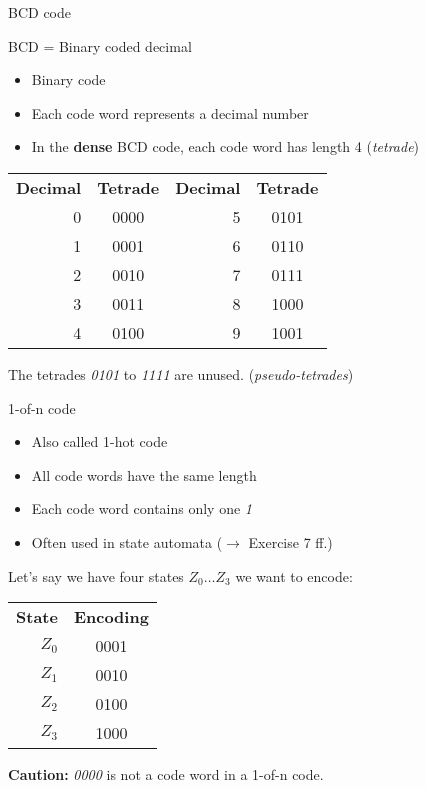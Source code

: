 \documentclass[11pt]{tudbeamer}
\begin{document}
\begin{frame}{BCD code}
	\centering
	
	BCD = Binary coded decimal
	\begin{itemize}
		\item Binary code
		\item Each code word represents a decimal number
		\item In the \textbf{dense} BCD code, each code word has length 4 (\textit{tetrade})
	\end{itemize}
	
	\begin{tabular}{rc|rc}
		\textbf{Decimal}	& \textbf{Tetrade} & \textbf{Decimal} & \textbf{Tetrade} \\
		0 & 0000 & 5 & 0101 \\
		1 & 0001 & 6 & 0110 \\
		2 & 0010 & 7 & 0111 \\
		3 & 0011 & 8 & 1000 \\
		4 & 0100 & 9 & 1001 \\
	\end{tabular}
	
	The tetrades \textit{0101} to \textit{1111} are unused. (\textit{pseudo-tetrades})

\end{frame}

\begin{frame}{1-of-n code}
\centering

	\begin{itemize}
		\item Also called 1-hot code
		\item All code words have the same length
		\item Each code word contains only one \textit{1}
		\item Often used in state automata ($\rightarrow$ Exercise 7 ff.)
	\end{itemize}
	
	Let's say we have four states $Z_0 \dots Z_3$ we want to encode:
	
	\begin{tabular}{rc}
		\textbf{State} & \textbf{Encoding} \\
		$Z_0$ & 0001 \\
		$Z_1$ & 0010 \\
		$Z_2$ & 0100 \\
		$Z_3$ & 1000 \\
	\end{tabular}
	
	\textbf{Caution:} \textit{0000} is not a code word in a 1-of-n code.

\end{frame}
\end{document}
